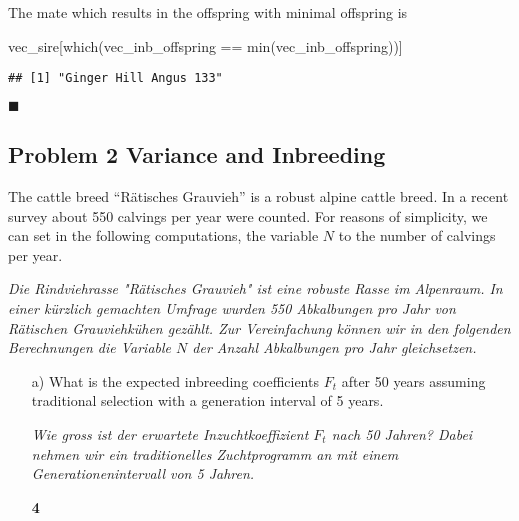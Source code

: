 \documentclass[
]{article}
\newenvironment{Shaded}{\begin{snugshade}}{\end{snugshade}}
\newcommand{\FunctionTok}[1]{\textcolor[rgb]{0.00,0.00,0.00}{#1}}
\newcommand{\NormalTok}[1]{#1}
\newcommand{\SpecialCharTok}[1]{\textcolor[rgb]{0.00,0.00,0.00}{#1}}
\newcommand{\points}[1]
{\begin{flushright}\textbf{#1}\end{flushright}}
\newcommand{\solend}
{\vspace{2ex}$\blacksquare$}
\begin{document}
The mate which results in the offspring with minimal offspring is

\begin{Shaded}
\begin{Highlighting}[]
\NormalTok{vec\_sire[}\FunctionTok{which}\NormalTok{(vec\_inb\_offspring }\SpecialCharTok{==} \FunctionTok{min}\NormalTok{(vec\_inb\_offspring))]}
\end{Highlighting}
\end{Shaded}

\begin{verbatim}
## [1] "Ginger Hill Angus 133"
\end{verbatim}

\solend

\clearpage
\pagebreak

\hypertarget{problem-2-variance-and-inbreeding}{%
\subsection{Problem 2 Variance and
Inbreeding}\label{problem-2-variance-and-inbreeding}}

\vspace{3ex}

The cattle breed ``Rätisches Grauvieh'' is a robust alpine cattle breed.
In a recent survey about 550 calvings per year were counted. For reasons
of simplicity, we can set in the following computations, the variable
\(N\) to the number of calvings per year.

\vspace{3ex}

\textit{Die Rindviehrasse "Rätisches Grauvieh" ist eine robuste Rasse im Alpenraum. In einer kürzlich gemachten Umfrage wurden 550 Abkalbungen pro Jahr von Rätischen Grauviehkühen gezählt. Zur Vereinfachung können wir in den folgenden Berechnungen die Variable $N$ der Anzahl Abkalbungen pro Jahr gleichsetzen.}

\vspace{3ex}
\begin{enumerate}
\item[a)] What is the expected inbreeding coefficients $F_t$ after 50 years assuming traditional selection with a generation interval of 5 years. 

\textit{Wie gross ist der erwartete Inzuchtkoeffizient $F_t$ nach 50 Jahren? Dabei nehmen wir ein traditionelles Zuchtprogramm an mit einem Generationenintervall von 5 Jahren.}
\points{4}
\end{enumerate}
\end{document}
